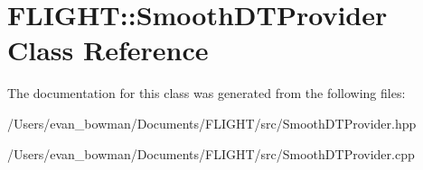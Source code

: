 \hypertarget{class_f_l_i_g_h_t_1_1_smooth_d_t_provider}{}\section{F\+L\+I\+G\+HT\+:\+:Smooth\+D\+T\+Provider Class Reference}
\label{class_f_l_i_g_h_t_1_1_smooth_d_t_provider}


The documentation for this class was generated from the following files\+:\begin{DoxyCompactItemize}
\item 
/\+Users/evan\+\_\+bowman/\+Documents/\+F\+L\+I\+G\+H\+T/src/Smooth\+D\+T\+Provider.\+hpp\item 
/\+Users/evan\+\_\+bowman/\+Documents/\+F\+L\+I\+G\+H\+T/src/Smooth\+D\+T\+Provider.\+cpp\end{DoxyCompactItemize}
